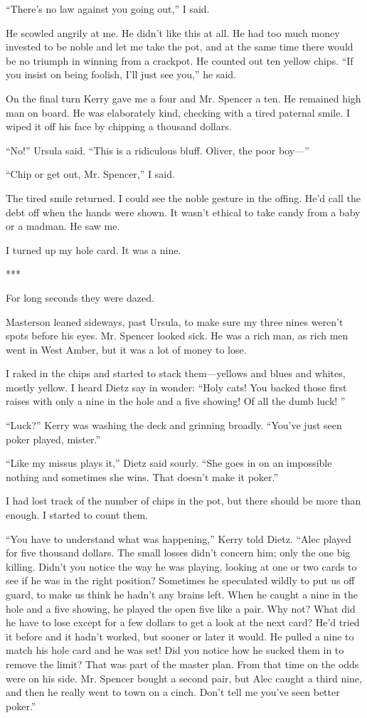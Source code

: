 \documentclass{novel}
\begin{document}
{“There’s no law against you going out,” I said.

He scowled angrily at me. He didn’t like this at all. He had too much money invested to be noble and let me take the pot, and at the same time there would be no triumph in winning from a crackpot. He counted out ten yellow chips. “If you insist on being foolish, I’ll just see you,” he said.

On the final turn Kerry gave me a four and Mr. Spencer a ten. He remained high man on board. He was elaborately kind, checking with a tired paternal smile. I wiped it off his face by chipping a thousand dollars.

“No!” Ursula said. “This is a ridiculous bluff. Oliver, the poor boy—”

“Chip or get out, Mr. Spencer,” I said.

The tired smile returned. I could see the noble gesture in the offing. He’d call the debt off when the hands were shown. It wasn’t ethical to take candy from a baby or a madman. He saw me.

I turned up my hole card. It was a nine.

***

For long seconds they were dazed.

Masterson leaned sideways, past Ursula, to make sure my three nines weren’t spots before his eyes. Mr. Spencer looked sick. He was a rich man, as rich men went in West Amber, but it was a lot of money to lose.

I raked in the chips and started to stack them—yellows and blues and whites, mostly yellow. I heard Dietz say in wonder: “Holy cats! You backed those first raises with only a nine in the hole and a five showing! Of all the dumb luck! ”

“Luck?” Kerry was washing the deck and grinning broadly. “You’ve just seen poker played, mister.”

“Like my missus plays it,” Dietz said sourly. “She goes in on an impossible nothing and sometimes she wins. That doesn’t make it poker.”

I had lost track of the number of chips in the pot, but there should be more than enough. I started to count them.

“You have to understand what was happening,” Kerry told Dietz. “Alec played for five thousand dollars. The small losses didn’t concern him; only the one big killing. Didn’t you notice the way he was playing, looking at one or two cards to see if he was in the right position? Sometimes he speculated wildly to put us off guard, to make us think he hadn’t any brains left. When he caught a nine in the hole and a five showing, he played the open five like a pair. Why not? What did he have to lose except for a few dollars to get a look at the next card? He’d tried it before and it hadn’t worked, but sooner or later it would. He pulled a nine to match his hole card and he was set! Did you notice how he sucked them in to remove the limit? That was part of the master plan. From that time on the odds were on his side. Mr. Spencer bought a second pair, but Alec caught a third nine, and then he really went to town on a cinch. Don’t tell me you’ve seen better poker.”

}
\end{document}
